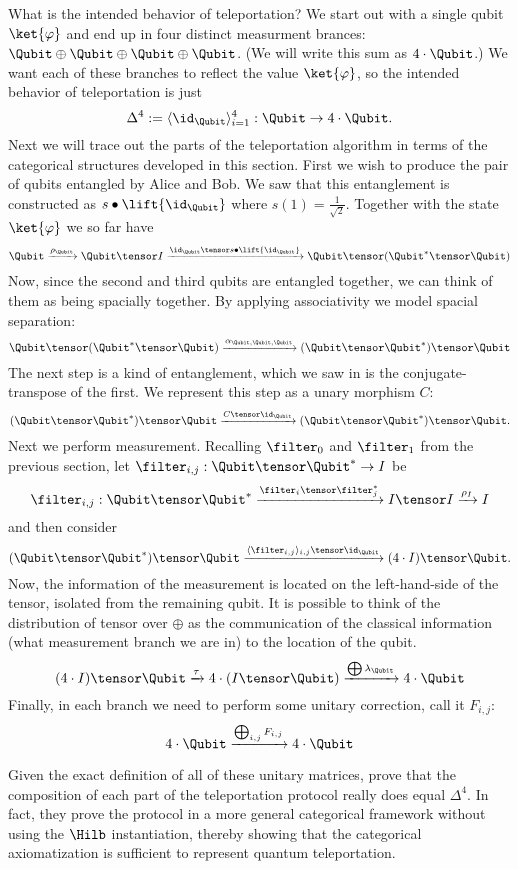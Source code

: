 What is the intended behavior of teleportation? We start out with a single qubit $\ket{\varphi}$
and end up in four distinct measurment brances: $\Qubit \oplus \Qubit \oplus \Qubit \oplus \Qubit$.
(We will write this sum as $4 \cdot \Qubit$.) We want each of these branches to reflect the value
$\ket{\varphi}$, so the intended behavior of teleportation is just
\[ \Delta^4 := \langle  \id_\Qubit \rangle_{i=1}^{4} : \Qubit \rightarrow 4 \cdot \Qubit. \]
Next we will trace out the parts of the teleportation algorithm in terms of the categorical 
structures developed in this section.
First we wish to produce the pair of qubits entangled by Alice and Bob. We saw that this entanglement
is constructed as $s \bullet \lift{\id_{\Qubit}}$ where $s(1)=\frac 1 {\sqrt{2}}$. Together with the state 
$\ket{\varphi}$ we so far have
\[
    \Qubit \xrightarrow{\rho_\Qubit} \Qubit \tensor I 
    \xrightarrow {\id_\Qubit \tensor s \bullet \lift{\id_\Qubit}} \Qubit \tensor (\Qubit^* \tensor \Qubit)
\]
Now, since the second and third qubits are entangled together, we can think of them as being
spacially together. By applying associativity we model spacial separation:
\[
    \Qubit \tensor (\Qubit^* \tensor \Qubit) 
    \xrightarrow{\alpha_{\Qubit,\Qubit,\Qubit}}
    (\Qubit \tensor \Qubit^*) \tensor \Qubit
\]
The next step is a kind of entanglement, which we saw in  is the 
conjugate-transpose of the first. We represent this step as a unary morphism $C$:
\[
    (\Qubit \tensor \Qubit^*) \tensor \Qubit
    \xrightarrow{C \tensor \id_\Qubit}
    (\Qubit \tensor \Qubit^*) \tensor \Qubit.
\]
Next we perform measurement. Recalling $\filter_0$ and $\filter_1$ from the previous
section, let $\filter_{i,j} : \Qubit \tensor \Qubit^* \rightarrow I$ be
\[  \filter_{i,j} : \Qubit \tensor \Qubit^* \xrightarrow{\filter_i \tensor \filter_j^*}  
    I \tensor I \xrightarrow{\rho_I} I \]
and then consider
\[  (\Qubit \tensor \Qubit^*) \tensor \Qubit
    \xrightarrow{\langle \filter_{i,j} \rangle_{i,j} \tensor \id_\Qubit} 
    (4 \cdot I) \tensor \Qubit. 
\]
Now, the information of the measurement is located on the left-hand-side of the tensor,
isolated from the remaining qubit. It is possible to think of the distribution of
tensor over $\oplus$ as the communication of the classical information (what measurement
branch we are in) to the location of the qubit. 
\[
    (4 \cdot I) \tensor \Qubit
    \xrightarrow{ \tau }
    4 \cdot (I \tensor \Qubit) 
    \xrightarrow{ \bigoplus \lambda_\Qubit}
    4 \cdot \Qubit
\]
Finally, in each branch we need to perform some unitary correction, call it $F_{i,j}$:
\[
    4 \cdot \Qubit
    \xrightarrow{ \bigoplus_{i,j} F_{i,j} }
    4 \cdot \Qubit
\]

Given the exact definition of all of these unitary matrices, \cite{abramsky2009categorical}
prove that the composition of each part of the teleportation protocol really
does equal $\Delta^4$. In fact, they prove the protocol in a more general categorical
framework without using the $\Hilb$ instantiation, thereby showing that
the categorical axiomatization is sufficient to represent quantum teleportation.
